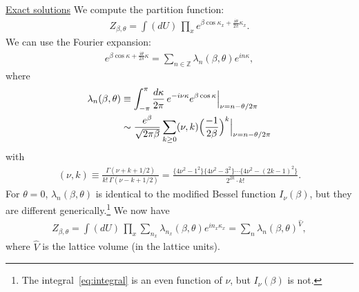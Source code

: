 \documentclass[12pt]{article}
\begin{document}

\noindent \underline{Exact solutions}\newline
We compute the partition function:
\begin{align}
  Z_{\beta,\theta}
  = \int (dU)\, \prod_{x} e^{\beta\cos\kappa_x +\frac{i\theta}{2\pi} \kappa_x}.
\end{align}
We can use the Fourier expansion:
\begin{align}
  e^{\beta \cos \kappa + \frac{i\theta}{2\pi} \kappa}
  = \sum_{n\in \mathbb{Z}} \lambda_n(\beta,\theta) e^{in \kappa},
\end{align}
where
\begin{align}
  \lambda_n(\beta,\theta)
  &\equiv \int_{-\pi}^\pi {d\kappa \over 2\pi}\,
    e^{-i \nu \kappa} e^{\beta \cos \kappa} \Big|_{\nu=n-\theta/2\pi} \label{eq:integral} \\
  &\sim
    \frac{e^\beta}{\sqrt{2\pi \beta}} \sum_{k\geq 0}
    (\nu,k)\Big(\frac{-1}{2\beta}\Big)^k
    \Big|_{\nu=n-\theta/2\pi}
    \label{eq:asymptotic}
\end{align}
with
\begin{align}
  (\nu,k) \equiv \frac{\Gamma(\nu+k+1/2)}{k!\, \Gamma(\nu-k+1/2)}
  = \frac{\{4\nu^2-1^2\}\{4\nu^2-3^2\}\cdots\{4\nu^2-(2k-1)^2\}}{2^{2k}\cdot k!}.
\end{align}
For $\theta=0$,
$\lambda_n(\beta,\theta)$ is identical to the modified Bessel function $I_\nu(\beta)$,
but they are different generically.\footnote{
  The integral~\eqref{eq:integral} is an even function of $\nu$,
  but $I_\nu(\beta)$ is not.
}
We now have
\begin{align}
  Z_{\beta,\theta}
  = \int (dU)\, \prod_x \sum_{n_x}
    \lambda_{n_x}(\beta,\theta)
    e^{i n_x \kappa_x}
  = \sum_n \lambda_n(\beta, \theta)^{\hat{V}},
\end{align}
where $\hat{V}$ is the lattice volume (in the lattice units).
\end{document}
